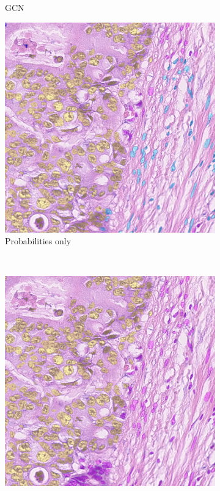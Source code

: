 \begin{figure}[H]
\begin{subfigure}[b]{0.45\textwidth}
    \caption{GCN}
    \label{fig:consep-gcn2}
  \end{subfigure}
  \hfill
  \begin{subfigure}[b]{0.45\textwidth}
    \includegraphics[width=\textwidth]{imgs/qual/consep/no-morph2.png}
    \caption{Probabilities only}
    \label{fig:consep-no-morph2}
  \end{subfigure}
  \\
  \begin{subfigure}[b]{0.45\textwidth}
    \includegraphics[width=\textwidth]{imgs/qual/consep/no-prior2.png}

\end{subfigure}
\end{figure}
